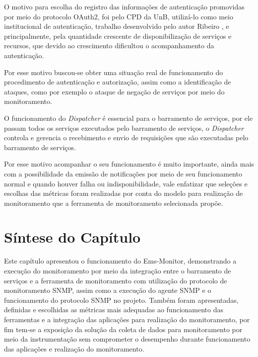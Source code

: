 O motivo para escolha do registro das informações de autenticação promovidas por meio do protocolo OAuth2, foi pelo \acrshort{CPD} da \acrshort{UnB}, utilizá-lo como meio institucional de autenticação, trabalho desenvolvido pelo autor Ribeiro \cite{ribeiro2017implementaccao}, e principalmente, pela quantidade crescente de disponibilização de serviços e recursos, que devido ao crescimento dificultou o acompanhamento da autenticação. 

Por esse motivo buscou-se obter uma situação real de funcionamento do procedimento de autenticação e autorização, assim como a identificação de ataques, como por exemplo o ataque de negação de serviços por meio do monitoramento. 

O funcionamento do \textit{Dispatcher} é essencial para o barramento de serviços, por ele passam todos os serviços executados pelo barramento de serviços, o \textit{Dispatcher} controla e gerencia o recebimento e envio de requisições que são executadas pelo barramento de serviços.

Por esse motivo acompanhar o seu funcionamento é muito importante, ainda mais com a possibilidade da emissão de notificações por meio de seu funcionamento normal e quando houver falha ou indisponibilidade, vale enfatizar que seleções e escolhas das métricas foram realizadas por conta do modelo para realização de monitoramento que a ferramenta de monitoramento selecionada propõe.   


\section{Síntese do Capítulo}
\label{sintese4}

Este capítulo apresentou o funcionamento do Ems-Monitor, demonstrando a execução do monitoramento por meio da integração entre o barramento de serviços e a ferramenta de monitoramento com utilização do protocolo de monitoramento \acrshort{SNMP}, assim como a execução do agente \acrshort{SNMP} e o funcionamento do protocolo \acrshort{SNMP} no projeto. Também foram apresentadas, definidas e escolhidas as métricas mais adequadas ao funcionamento das ferramentas e a integração das aplicações para realização do monitoramento, por fim tem-se a exposição da solução da coleta de dados para monitoramento por meio da instrumentação sem comprometer o desempenho durante funcionamento das aplicações e realização do monitoramento. 